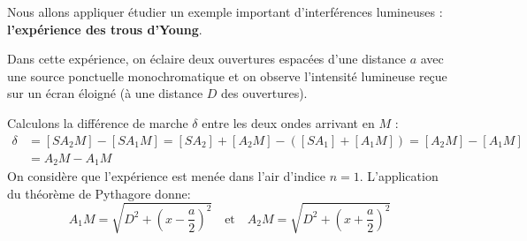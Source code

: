 \documentclass[MPSI]{cours}
\begin{document}
Nous allons appliquer étudier un exemple important d'interférences lumineuses : \textbf{l'expérience des trous d'Young}. 

Dans cette expérience, on éclaire deux ouvertures espacées d'une distance $a$  avec une source ponctuelle monochromatique et on observe l'intensité lumineuse reçue sur un écran éloigné (à une distance $D$ des ouvertures).
\begin{center}
\end{center}
Calculons la différence de marche $\delta$ entre les deux ondes arrivant en $M$ :
\begin{align}
  \delta &= [SA_2M] - [SA_1M] = [SA_2] + [A_2M] - ([SA_1] + [A_1M]) = [A_2M] - [A_1M] \\
         &= A_2M - A_1M
\end{align}
On considère que l'expérience est menée dans l'air d'indice $n=1$. L'application du théorème de Pythagore donne:
\begin{equation}
  A_1M = \sqrt{D^2 + \left(x-\frac{a}{2}\right)^2} \quad \text{et} \quad A_2M = \sqrt{D^2+ \left(x+\frac{a}{2}\right)^2}
\end{equation}
\end{document}
